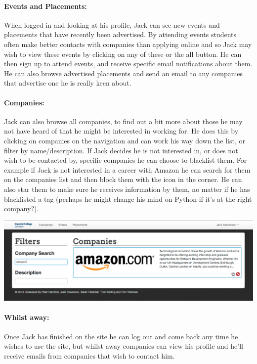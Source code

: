   \paragraph{Events and Placements:}
    When logged in and looking at his profile, Jack can see new events and placements that have recently been advertised. By attending events students often make better contacts with companies than applying online and so Jack may wish to view these events by clicking on any of these or the all button. He can then sign up to attend events, and receive specific email notifications about them.
    He can also browse advertised placements and send an email to any companies that advertise one he is really keen about.

  \paragraph{Companies:}
    Jack can also browse all companies, to find out a bit more about those he may not have heard of that he might be interested in working for. He does this by clicking on companies on the navigation and can work his way down the list, or filter by name/description.
    If Jack decides he is not interested in, or does not wish to be contacted by, specific companies he can choose to blacklist them. For example if Jack is not interested in a career with Amazon he can search for them on the companies list and then block them with the icon in the corner. He can also star them to make sure he receives information by them, no matter if he has blacklisted a tag (perhaps he might change his mind on Python if it's at the right company?).

    \begin{center}
    \includegraphics[scale=0.3]{images/user_experiences/student/block_amazon}
    \end{center}

  \paragraph{Whilst away:}
    Once Jack has finished on the site he can log out and come back any time he wishes to use the site, but whilst away companies can view his profile and he'll receive emails from companies that wish to contact him.


